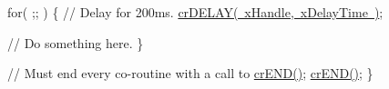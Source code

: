 \begin{DoxyPre}    for( ;; )
    \{
       // Delay for 200ms.
       \mbox{\hyperlink{croutine_8h_a05a06feb11028f2d1d440ea335f562ba}{crDELAY( xHandle, xDelayTime )}};\end{DoxyPre}



\begin{DoxyPre}       // Do something here.
    \}\end{DoxyPre}



\begin{DoxyPre}    // Must end every co-routine with a call to \mbox{\hyperlink{croutine_8h_ae6038cc976689b50000475ebfc4e2f23}{crEND()}};
    \mbox{\hyperlink{croutine_8h_ae6038cc976689b50000475ebfc4e2f23}{crEND()}};
\}\end{DoxyPre}
 